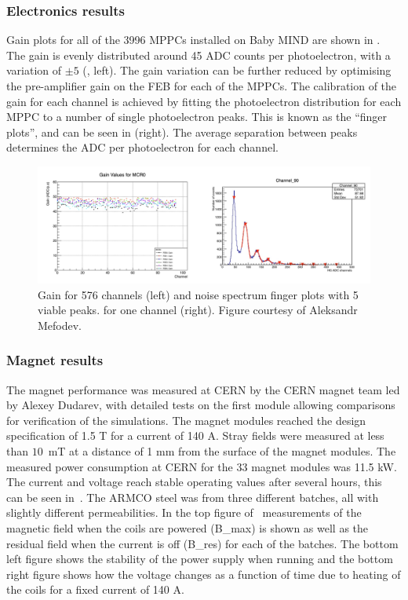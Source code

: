 \subsubsection{Electronics results}

Gain plots for all of the 3996 MPPCs installed on Baby MIND are shown in . The gain is evenly distributed around 45 ADC counts per photoelectron, with a variation of $\pm 5$ (, left). The gain variation can be further reduced by optimising the pre-amplifier gain on the FEB for each of the MPPCs. The calibration of the gain for each channel is achieved by fitting the photoelectron distribution for each MPPC to a number of single photoelectron peaks. This is known as the ``finger plots'', and can be seen in  (right). The average separation between peaks determines the ADC per photoelectron for each channel.

\begin{figure}[h!]
\centering
\includegraphics[width=\textwidth]{figures/mppcplot1.jpeg}
\caption{Gain for 576 channels (left) and noise spectrum finger plots with 5 viable peaks.
 for one channel (right). Figure courtesy of Aleksandr Mefodev.}
\label{fig:MPPCplot1}
\end{figure}

\subsubsection{Magnet results}

The magnet performance was measured at CERN by the CERN magnet team led by Alexey Dudarev, with detailed tests on the first module allowing comparisons for verification of the simulations. The magnet modules reached the design specification of 1.5 T for a current of 140 A. Stray fields were measured at less than $10$~mT at a distance of 1 mm from the surface of the magnet modules. The measured power consumption at CERN for the 33 magnet modules was 11.5 kW. %
The current and voltage reach stable operating values after several hours, this can be seen in~. The ARMCO steel was from three different batches, all with slightly different permeabilities. In the top figure of~ measurements of the magnetic field when the coils are powered (B\_max) is shown as well as the residual field when the current is off (B\_res) for each of the batches. The bottom left figure shows the stability of the power supply when running and the bottom right figure shows how the voltage changes as a function of time due to heating of the coils for a fixed current of 140 A.

